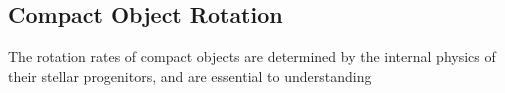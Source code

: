 {\color{orange}

\subsection{Compact Object Rotation}

The rotation rates of compact objects are determined by the internal physics of their stellar progenitors, and are essential to understanding 

}